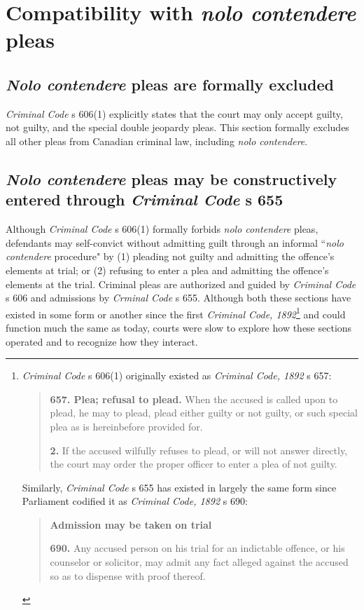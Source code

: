 \section{Compatibility with \textit{nolo contendere} pleas}

\subsection{\textit{Nolo contendere} pleas are formally excluded}

\textit{Criminal Code} s 606(1) explicitly states that the court may only accept guilty, not guilty, and the special double jeopardy pleas. This section formally excludes all other pleas from Canadian criminal law, including \textit{nolo contendere}. 

\subsection{\textit{Nolo contendere} pleas may be constructively entered through \textit{Criminal Code} s 655}

Although \textit{Criminal Code} s 606(1) formally forbids \textit{nolo contendere} pleas, defendants may self-convict without admitting guilt through an informal ``\textit{nolo contendere} procedure" by (1) pleading not guilty and admitting the offence's elements at trial; or (2) refusing to enter a plea and admitting the offence's elements at the trial. Criminal pleas are authorized and guided by \textit{Criminal Code} s 606 and admissions by \textit{Crminal Code} s 655. Although both these sections have existed in some form or another since the first \textit{Criminal Code, 1892}\footnote{\textit{Criminal Code} s 606(1) originally existed as \textit{Criminal Code, 1892} s 657:

\begin{quote}
\textbf{657. Plea; refusal to plead.} When the accused is called upon to plead, he may to plead, plead either guilty or not guilty, or such special plea as is hereinbefore provided for.

\textbf{2.} If the accused wilfully refuses to plead, or will not answer directly, the court may order the proper officer to enter a plea of not guilty. 
\end{quote}

Similarly, \textit{Criminal Code} s 655 has existed in largely the same form since Parliament codified it as \textit{Criminal Code, 1892} s 690:
\begin{quote}
    \textbf{Admission may be taken on trial}
    
    \textbf{690.} Any accused person on his trial for an indictable offence, or his counselor or solicitor, may admit any fact alleged against the accused so as to dispense with proof thereof.
\end{quote}
} and could function much the same as today, courts were slow to explore how these sections operated and to recognize how they interact.

